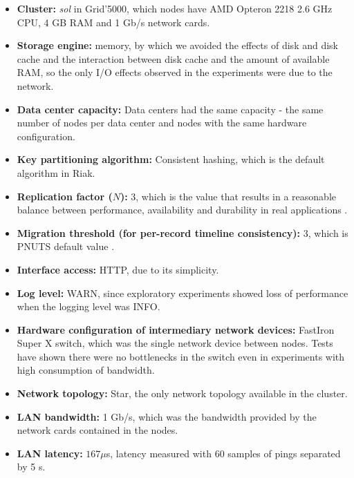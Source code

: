 \documentclass[doublespacing]{bmcart}
\begin{document}
\begin{itemize}

\item \textbf{Cluster:} \textit{sol} in Grid'5000, which nodes have AMD Opteron
2218 2.6 GHz CPU, 4 GB RAM and 1 Gb/s network cards.

\item \textbf{Storage engine:} memory, by which we avoided the effects of disk
and disk cache and the interaction between disk cache and the amount of
available RAM, so the only I/O effects observed in the experiments were due to
the network.

\item \textbf{Data center capacity:} Data centers had the same capacity - the
same number of nodes per data center and nodes with the same hardware
configuration.

\item \textbf{Key partitioning algorithm:} Consistent hashing, which is the
default algorithm in Riak.

\item \textbf{Replication factor ($ N $):} 3, which is the value that results
in a reasonable balance between performance, availability and durability in
real applications \cite{DeCandia2007}.

\item \textbf{Migration threshold (for per-record timeline consistency):} 3,
which is PNUTS default value \cite{Cooper2008}.

\item \textbf{Interface access:} HTTP, due to its simplicity.

\item \textbf{Log level:} WARN, since exploratory experiments showed loss of
performance when the logging level was INFO.

\item \textbf{Hardware configuration of intermediary network devices:} FastIron
Super X switch, which was the single network device between nodes. Tests have
shown there were no bottlenecks in the switch even in experiments with high
consumption of bandwidth.

\item \textbf{Network topology:} Star, the only network topology available in
the cluster.

\item \textbf{LAN bandwidth:} 1 Gb/s, which was the bandwidth provided by the
network cards contained in the nodes.

\item \textbf{LAN latency:} $167\mu$s, latency measured with 60 samples of
pings separated by 5 s.


\end{itemize}
\end{document}
